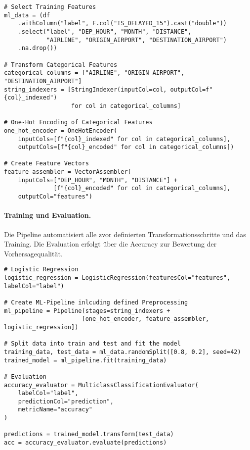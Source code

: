 \documentclass[a4paper,11pt]{article}
\begin{document}
\begin{verbatim}
# Select Training Features
ml_data = (df
    .withColumn("label", F.col("IS_DELAYED_15").cast("double"))
    .select("label", "DEP_HOUR", "MONTH", "DISTANCE",
            "AIRLINE", "ORIGIN_AIRPORT", "DESTINATION_AIRPORT")
    .na.drop())

# Transform Categorical Features
categorical_columns = ["AIRLINE", "ORIGIN_AIRPORT", "DESTINATION_AIRPORT"]
string_indexers = [StringIndexer(inputCol=col, outputCol=f"{col}_indexed") 
                   for col in categorical_columns]

# One-Hot Encoding of Categorical Features
one_hot_encoder = OneHotEncoder(
    inputCols=[f"{col}_indexed" for col in categorical_columns],
    outputCols=[f"{col}_encoded" for col in categorical_columns])

# Create Feature Vectors
feature_assembler = VectorAssembler(
    inputCols=["DEP_HOUR", "MONTH", "DISTANCE"] +
              [f"{col}_encoded" for col in categorical_columns],
    outputCol="features")
\end{verbatim}

\paragraph{Training und Evaluation.} Die Pipeline automatisiert alle zvor definierten Transformationsschritte und das Training. Die Evaluation erfolgt über die Accuracy zur Bewertung der Vorhersagequalität.

\begin{verbatim}
# Logistic Regression
logistic_regression = LogisticRegression(featuresCol="features", labelCol="label")

# Create ML-Pipeline inlcuding defined Preprocessing
ml_pipeline = Pipeline(stages=string_indexers + 
                      [one_hot_encoder, feature_assembler, logistic_regression])

# Split data into train and test and fit the model
training_data, test_data = ml_data.randomSplit([0.8, 0.2], seed=42)
trained_model = ml_pipeline.fit(training_data)

# Evaluation
accuracy_evaluator = MulticlassClassificationEvaluator(
    labelCol="label", 
    predictionCol="prediction", 
    metricName="accuracy"
)

predictions = trained_model.transform(test_data)
acc = accuracy_evaluator.evaluate(predictions)
\end{verbatim}
\end{document}
